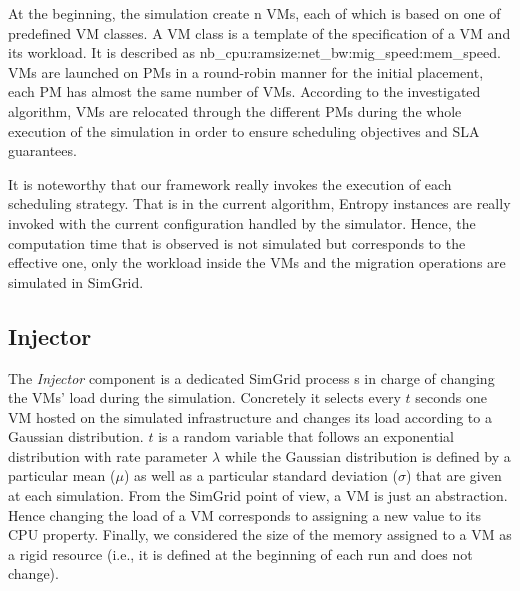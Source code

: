 \documentclass[conference]{IEEEtran}
\newcommand{\sg}{SimGrid\xspace}
\begin{document}
At the beginning, the simulation create n VMs, each of which is based on one of predefined VM classes. A VM class is a
template of the specification of a VM and its workload. It is described as
nb_cpu:ramsize:net_bw:mig_speed:mem_speed. VMs are launched on PMs in
a round-robin manner for the initial placement, \ie each PM has almost the same number of VMs.
According to the investigated algorithm, VMs are relocated through the
different PMs during the whole execution of the simulation in order to
ensure scheduling objectives and SLA guarantees.

It is noteworthy that our framework really invokes the execution of
each scheduling strategy. That is in the current algorithm,  Entropy instances are really invoked with the current configuration
handled by the simulator. Hence, the computation time that is observed
is not simulated but corresponds to the effective one, only the
workload inside the VMs and the migration operations are simulated in \sg.

\subsection{Injector}
The \emph{Injector} component is a dedicated \sg process s in charge of changing the VMs' load during the
simulation.  Concretely it selects every $t$ seconds one VM hosted on
the simulated infrastructure and changes its load according to a
Gaussian distribution. $t$ is a random variable that follows an
exponential distribution with rate parameter $\lambda$ while the
Gaussian distribution is defined by a particular mean ($\mu$) as well
as a particular standard deviation ($\sigma$) that are given at each
simulation.  From the SimGrid point of view, a VM is just an
abstraction.  Hence changing the load of a VM corresponds to assigning
a new value to its CPU property.  Finally, we considered the size of
the memory assigned to a VM as a rigid resource (i.e., it is defined at
the beginning of each run and does not change).
\end{document}

